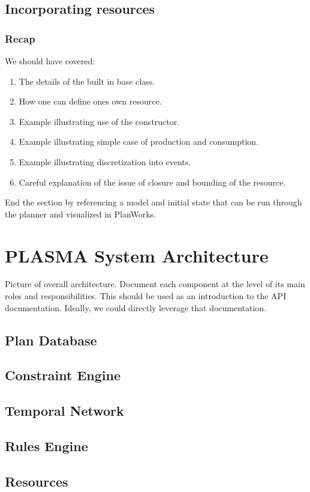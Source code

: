 \documentclass[10pt, letterpaper, twoside]{article}
\begin{document}
\subsection{Incorporating resources}
\subsubsection{Recap}
We should have covered:
\begin{enumerate}
\item The details of the built in base class. 
\item How one can define ones own resource.
\item Example illustrating use of the constructor.
\item Example illustrating simple case of production and consumption.
\item Example illustrating discretization into events.
\item Careful explanation of the issue of closure and bounding of the resource.
\end{enumerate}

End the section by referencing a model and initial state that can be run through the planner and visualized in PlanWorks.

\section{PLASMA System Architecture}
Picture of overall architecture. Document each component at the level of its main roles and responsibilities. This should be used as an introduction to the API documentation. Ideally, we could directly leverage that documentation.
\subsection{Plan Database}
\subsection{Constraint Engine}
\subsection{Temporal Network}
\subsection{Rules Engine}
\subsection{Resources}
\end{document}
